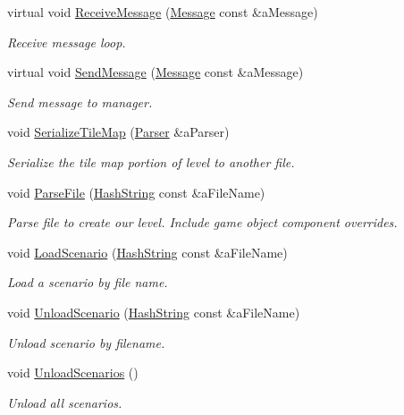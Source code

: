 \begin{DoxyCompactItemize}
virtual void \hyperlink{classLevel_aee4d59380ea3bac3dcf70b4514bae30e}{Receive\+Message} (\hyperlink{classMessage}{Message} const \&a\+Message)
\begin{DoxyCompactList}\small\item\em Receive message loop. \end{DoxyCompactList}\item 
virtual void \hyperlink{classLevel_af364fce2cd7b5c7b626aba5add5e7ca4}{Send\+Message} (\hyperlink{classMessage}{Message} const \&a\+Message)
\begin{DoxyCompactList}\small\item\em Send message to manager. \end{DoxyCompactList}\item 
void \hyperlink{classLevel_a027cb9c4148fa186b074ab41f0f07478}{Serialize\+Tile\+Map} (\hyperlink{classParser}{Parser} \&a\+Parser)
\begin{DoxyCompactList}\small\item\em Serialize the tile map portion of level to another file. \end{DoxyCompactList}\item 
void \hyperlink{classLevel_af03cc2b88deb2b473c9096538bb15aee}{Parse\+File} (\hyperlink{classHashString}{Hash\+String} const \&a\+File\+Name)
\begin{DoxyCompactList}\small\item\em Parse file to create our level. Include game object component overrides. \end{DoxyCompactList}\item 
void \hyperlink{classLevel_a639a4d91ecd7995a534d254c4c5b3c64}{Load\+Scenario} (\hyperlink{classHashString}{Hash\+String} const \&a\+File\+Name)
\begin{DoxyCompactList}\small\item\em Load a scenario by file name. \end{DoxyCompactList}\item 
void \hyperlink{classLevel_ab3adef99549de6359db3f7db858890b3}{Unload\+Scenario} (\hyperlink{classHashString}{Hash\+String} const \&a\+File\+Name)
\begin{DoxyCompactList}\small\item\em Unload scenario by filename. \end{DoxyCompactList}\item 
void \hyperlink{classLevel_a2c946ce8a4005fd87e6e9ab751a1d20b}{Unload\+Scenarios} ()
\begin{DoxyCompactList}\small\item\em Unload all scenarios. \end{DoxyCompactList}\end{DoxyCompactItemize}
